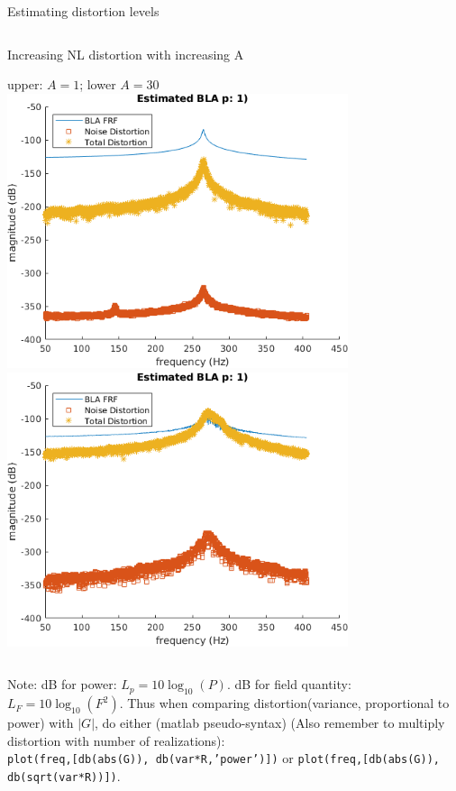 \documentclass[9pt]{beamer}
\begin{document}
\begin{frame}{Estimating distortion levels}
\begin{columns}
\begin{column}{0.5\textwidth}
      Increasing NL distortion with increasing A
      \vspace{-1mm}
      \begin{center}
        upper: $A=1$; lower $A=30$\\
        \includegraphics[width=0.75\textwidth]{fig/b1_A1_ms_full_bla}
        \includegraphics[width=0.75\textwidth]{fig/b1_A30_ms_full_bla}
      \end{center}
    \end{column}
  \end{columns}
  \tiny{Note: dB for power: $L_p=10\log_{10}(P)$. dB for field quantity:
    $L_F=10\log_{10}(F^2)$. Thus when comparing distortion(variance,
    proportional to power) with $|G|$, do either (matlab pseudo-syntax)
    (Also remember to multiply distortion with number of realizations):\\
    \texttt{plot(freq,[db(abs(G)), db(var*R,'power')])} or
    \texttt{plot(freq,[db(abs(G)), db(sqrt(var*R))])}}.
\end{frame}
\end{document}
